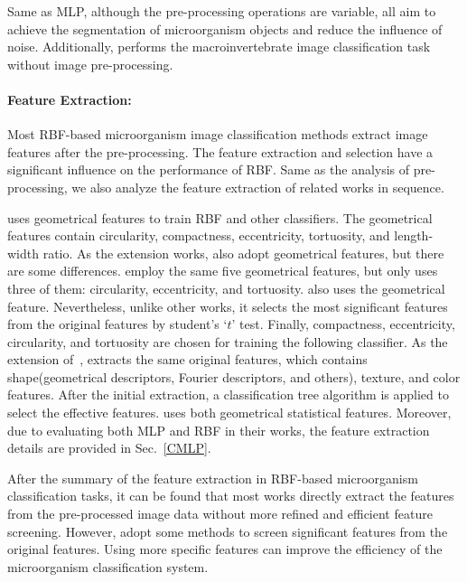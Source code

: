 Same as MLP, although the pre-processing operations are variable, all aim to achieve the segmentation of microorganism objects and reduce the influence of noise. Additionally, \cite{Kiranyaz-2011-CRMI} performs the macroinvertebrate image classification task without image pre-processing.

\paragraph{\textbf{Feature Extraction:}}
Most RBF-based microorganism image classification methods extract image features after the pre-processing. The feature extraction and selection have a significant influence on the performance of RBF. Same as the analysis of pre-processing, we also analyze the feature extraction of related works in sequence.

\cite{Hiremath-2010-AICB} uses geometrical features to train RBF and other classifiers. The geometrical features contain circularity, compactness, eccentricity, tortuosity, and length-width ratio. As the extension works, \cite{Hiremath-2010-DIAC,Hiremath-2011-ICCB,Hiremath-2011-DMIA,Hiremath-2012-SBCI} also adopt geometrical features, but there are some differences. \cite{Hiremath-2010-DIAC,Hiremath-2011-ICCB,Hiremath-2011-DMIA} employ the same five geometrical features, but \cite{Hiremath-2012-SBCI} only uses three of them: circularity, eccentricity, and tortuosity. \cite{Priya-2015-AITO} also uses the geometrical feature. Nevertheless, unlike other works, it selects the most significant features from the original features by student’s ‘$t$’ test. Finally, compactness, eccentricity, circularity, and tortuosity are chosen for training the following classifier. As the extension of~\cite{Weller-2005-SCSO}, \cite{Weller-2007-TSNN} extracts the same original features, which contains shape(geometrical descriptors, Fourier descriptors, and others), texture, and color features. After the initial extraction, a classification tree algorithm is applied to select the effective features. \cite{Kiranyaz-2011-CRMI} uses both geometrical statistical features. Moreover, due to \cite{Culverhouse-1996-ACFD,Culverhouse-2000-DAMV,Kruk-2015-CCSI} evaluating both MLP and RBF in their works, the feature extraction details are provided in Sec.~\ref{CMLP}.


After the summary of the feature extraction in RBF-based microorganism classification tasks, it can be found that most works directly extract the features from the pre-processed image data without more refined and efficient feature screening. However, \cite{Priya-2015-AITO,Weller-2007-TSNN} adopt some methods to screen significant features from the original features. Using more specific features can improve the efficiency of the microorganism classification system.


